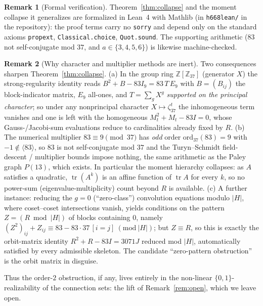 \documentclass[11pt]{article}
\theoremstyle{definition}
\newtheorem{remark}{Remark}
\newcommand{\Z}{\mathbb{Z}}
\begin{document}
\begin{remark}[Formal verification]
Theorem~\ref{thm:collapse} and the moment collapse it generalizes are formalized in Lean~4 with Mathlib
(in \texttt{h668lean/} in the repository): the proof terms carry no \texttt{sorry} and depend only on the
standard axioms \texttt{propext}, \texttt{Classical.choice}, \texttt{Quot.sound}. The supporting arithmetic
($83$ not self-conjugate mod $37$, and $a\in\{3,4,5,6\}$) is likewise machine-checked.
\end{remark}

\begin{remark}[Why character and multiplier methods are inert]\label{rem:inert}
Two consequences sharpen Theorem~\ref{thm:collapse}. (a) In the group ring $\Z[\Z_{37}]$ (generator $X$) the
strong-regularity identity reads $B^2+B-83I_9=83\,T\,E_9$ with $B=(B_{ij})$ the block-indicator matrix,
$E_9$ all-ones, and $T=\sum_g X^g$ \emph{supported on the principal character}; so under any nonprincipal
character $X\mapsto\zeta_{37}^{t}$ the inhomogeneous term vanishes and one is left with the homogeneous
$M_t^2+M_t-83I=0$, whose Gauss-/Jacobi-sum evaluations reduce to cardinalities already fixed by $R$.
(b) The numerical multiplier $83\equiv9\pmod{37}$ has \emph{odd} order $\mathrm{ord}_{37}(83)=9$ with
$-1\notin\langle83\rangle$, so $83$ is not self-conjugate mod $37$ and the Turyn--Schmidt field-descent /
multiplier bounds impose nothing, the same arithmetic as the Paley graph $P(13)$, which exists. In
particular the moment hierarchy collapses: as $A$ satisfies a quadratic, $\operatorname{tr}(A^k)$ is an
affine function of $\operatorname{tr}A$ for every $k$, so no power-sum (eigenvalue-multiplicity) count
beyond $R$ is available. (c) A further instance: reducing the $g=0$ (``zero-class'') convolution equations
modulo $|H|$, where coset--coset intersections vanish, yields conditions on the pattern
$Z=(R\bmod|H|)$ of blocks containing $0$, namely $(Z^2)_{ij}+Z_{ij}\equiv 83-83\cdot37\,[i{=}j]\
(\mathrm{mod}\ |H|)$; but $Z\equiv R$, so this is exactly the orbit-matrix identity
$R^2+R-83I=3071J$ reduced mod $|H|$, automatically satisfied by every admissible skeleton. The candidate
``zero-pattern obstruction'' is the orbit matrix in disguise.
\end{remark}

Thus the order-$2$ obstruction, if any, lives entirely in the non-linear $\{0,1\}$-realizability of the
connection sets: the lift of Remark~\ref{rem:open}, which we leave open.
\end{document}
